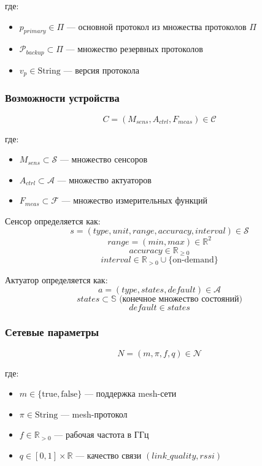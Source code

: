\documentclass{article}
\begin{document}
где:
\begin{itemize}
    \item $p_{primary} \in \Pi$ — основной протокол из множества протоколов $\Pi$
    \item $\mathcal{P}_{backup} \subset \Pi$ — множество резервных протоколов
    \item $v_p \in \text{String}$ — версия протокола
\end{itemize}

\subsubsection{Возможности устройства}
\[
C = (M_{sens}, A_{ctrl}, F_{meas}) \in \mathcal{C}
\]

где:
\begin{itemize}
    \item $M_{sens} \subset \mathcal{S}$ — множество сенсоров
    \item $A_{ctrl} \subset \mathcal{A}$ — множество актуаторов
    \item $F_{meas} \subset \mathcal{F}$ — множество измерительных функций
\end{itemize}

Сенсор определяется как:
\[
s = (type, unit, range, accuracy, interval) \in \mathcal{S}
\]
\[
range = (min, max) \in \mathbb{R}^2
\]
\[
accuracy \in \mathbb{R}_{\geq 0}
\]
\[
interval \in \mathbb{R}_{>0} \cup \{\text{on-demand}\}
\]

Актуатор определяется как:
\[
a = (type, states, default) \in \mathcal{A}
\]
\[
states \subset \mathbb{S} \text{ (конечное множество состояний)}
\]
\[
default \in states
\]

\subsubsection{Сетевые параметры}
\[
N = (m, \pi, f, q) \in \mathcal{N}
\]

где:
\begin{itemize}
    \item $m \in \{\text{true}, \text{false}\}$ — поддержка mesh-сети
    \item $\pi \in \text{String}$ — mesh-протокол
    \item $f \in \mathbb{R}_{>0}$ — рабочая частота в ГГц
    \item $q \in [0, 1] \times \mathbb{R}$ — качество связи $(link\_quality, rssi)$
\end{itemize}
\end{document}
